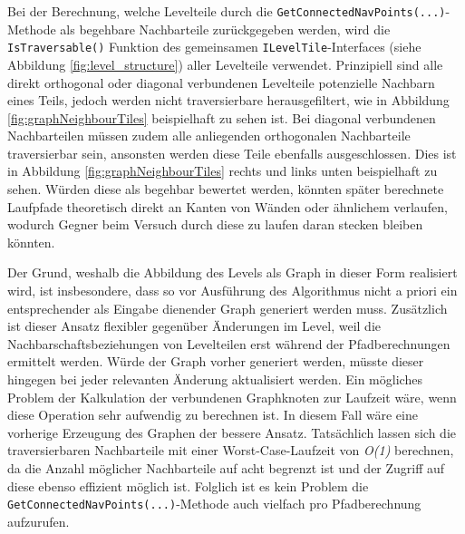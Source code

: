 Bei der Berechnung, welche Levelteile durch die \texttt{GetConnectedNavPoints(...)}-Methode als begehbare Nachbarteile zurückgegeben werden, wird die \texttt{IsTraversable()} Funktion des gemeinsamen \texttt{ILevelTile}-Interfaces (siehe Abbildung \ref{fig:level_structure}) aller Levelteile verwendet. Prinzipiell sind alle direkt orthogonal oder diagonal verbundenen Levelteile potenzielle Nachbarn eines Teils, jedoch werden nicht traversierbare herausgefiltert, wie in Abbildung \ref{fig:graphNeighbourTiles} beispielhaft zu sehen ist. Bei diagonal verbundenen Nachbarteilen müssen zudem alle anliegenden orthogonalen Nachbarteile traversierbar sein, ansonsten werden diese Teile ebenfalls ausgeschlossen. Dies ist in Abbildung \ref{fig:graphNeighbourTiles} rechts und links unten beispielhaft zu sehen. Würden diese als begehbar bewertet werden, könnten später berechnete Laufpfade theoretisch direkt an Kanten von Wänden oder ähnlichem verlaufen, wodurch Gegner beim Versuch durch diese zu laufen daran stecken bleiben könnten.

Der Grund, weshalb die Abbildung des Levels als Graph in dieser Form realisiert wird, ist insbesondere, dass so vor Ausführung des Algorithmus nicht a priori ein entsprechender als Eingabe dienender Graph generiert werden muss. Zusätzlich ist dieser Ansatz flexibler gegenüber Änderungen im Level, weil die Nachbarschaftsbeziehungen von Levelteilen erst während der Pfadberechnungen ermittelt werden. Würde der Graph vorher generiert werden, müsste dieser hingegen bei jeder relevanten Änderung aktualisiert werden. Ein mögliches Problem der Kalkulation der verbundenen Graphknoten zur Laufzeit wäre, wenn diese Operation sehr aufwendig zu berechnen ist. In diesem Fall wäre eine vorherige Erzeugung des Graphen der bessere Ansatz. Tatsächlich lassen sich die traversierbaren Nachbarteile mit einer Worst-Case-Laufzeit von \textit{O(1)} berechnen, da die Anzahl möglicher Nachbarteile auf acht begrenzt ist und der Zugriff auf diese ebenso effizient möglich ist. Folglich ist es kein Problem die \texttt{GetConnectedNavPoints(...)}-Methode auch vielfach pro Pfadberechnung aufzurufen.

